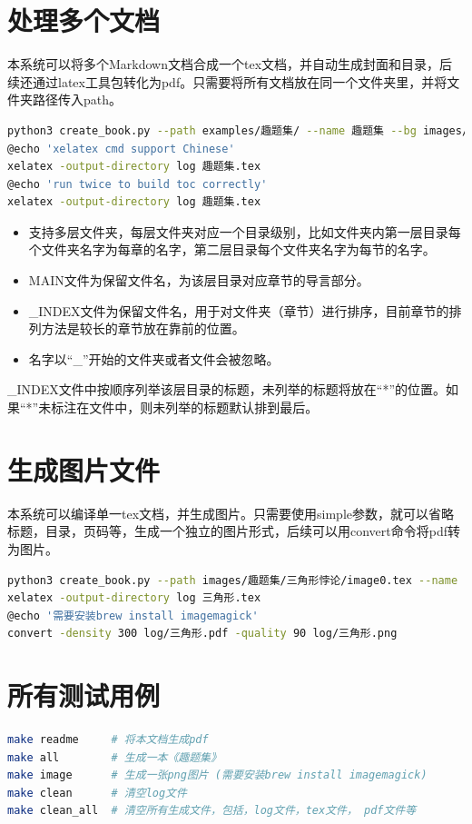 \documentclass[export, 12pt, letterpaper]{ctexrep}
\begin{document}
\section{处理多个文档}
本系统可以将多个Markdown文档合成一个tex文档，并自动生成封面和目录，后续还通过latex工具包转化为pdf。只需要将所有文档放在同一个文件夹里，并将文件夹路径传入path。


\begin{lstlisting}[language=Bash]
python3 create_book.py --path examples/趣题集/ --name 趣题集 --bg images/趣题集/background.jpeg --author 南方小智
@echo 'xelatex cmd support Chinese'
xelatex -output-directory log 趣题集.tex
@echo 'run twice to build toc correctly'
xelatex -output-directory log 趣题集.tex
\end{lstlisting}


\begin{itemize}
\item{ 支持多层文件夹，每层文件夹对应一个目录级别，比如文件夹内第一层目录每个文件夹名字为每章的名字，第二层目录每个文件夹名字为每节的名字。 }
\item{ MAIN文件为保留文件名，为该层目录对应章节的导言部分。 }
\item{ \_INDEX文件为保留文件名，用于对文件夹（章节）进行排序，目前章节的排列方法是较长的章节放在靠前的位置。 }
\item{ 名字以“\_”开始的文件夹或者文件会被忽略。 }
\end{itemize}


\_INDEX文件中按顺序列举该层目录的标题，未列举的标题将放在“*”的位置。如果“*”未标注在文件中，则未列举的标题默认排到最后。




\section{生成图片文件}
本系统可以编译单一tex文档，并生成图片。只需要使用simple参数，就可以省略标题，目录，页码等，生成一个独立的图片形式，后续可以用convert命令将pdf转为图片。

\begin{lstlisting}[language=Bash]
python3 create_book.py --path images/趣题集/三角形悖论/image0.tex --name 三角形 --simple
xelatex -output-directory log 三角形.tex
@echo '需要安装brew install imagemagick'
convert -density 300 log/三角形.pdf -quality 90 log/三角形.png
\end{lstlisting}

\section{所有测试用例}
\begin{lstlisting}[language=Bash]
make readme     # 将本文档生成pdf
make all        # 生成一本《趣题集》
make image      # 生成一张png图片 (需要安装brew install imagemagick)
make clean      # 清空log文件
make clean_all  # 清空所有生成文件，包括，log文件，tex文件， pdf文件等
\end{lstlisting}
\end{document}
